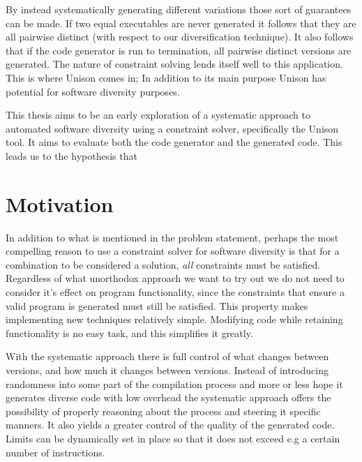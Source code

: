 By instead systematically generating different variations those sort of guarantees can be
made. If two equal executables are never generated it follows that they are all pairwise
distinct (with respect to our diversification technique). It also follows that if the
code generator is run to termination, all pairwise distinct versions are generated.
The nature of constraint solving lends itself well to this application. This is where
Unison comes in; In addition to its main purpose Unison has potential for software
diversity purposes.

This thesis aims to be an early exploration of a systematic approach to automated software
diversity using a constraint solver, specifically the Unison tool. It aims to evaluate
both the code generator and the generated code. This leads us to the hypothesis that


\section{Motivation}

In addition to what is mentioned in the problem statement, perhaps the most compelling
reason to use a constraint solver for software diversity is that for a combination to be
considered a solution, \textit{all} constraints must be satisfied. Regardless of what
unorthodox approach we want to try out we do not need to consider it's effect on program
functionality, since the constraints that ensure a valid program is generated must still
be satisfied. This property makes implementing new techniques relatively simple. Modifying
code while retaining functionality is no easy task, and this simplifies it greatly.

With the systematic approach there is full control of what changes between versions, and
how much it changes between versions. Instead of introducing randomness into some part of
the compilation process and more or less hope it generates diverse code with low overhead
the systematic approach offers the possibility of properly reasoning about the process and
steering it specific manners. It also yields a greater control of the quality of the
generated code. Limits can be dynamically set in place so that it does not exceed e.g a
certain number of instructions.
